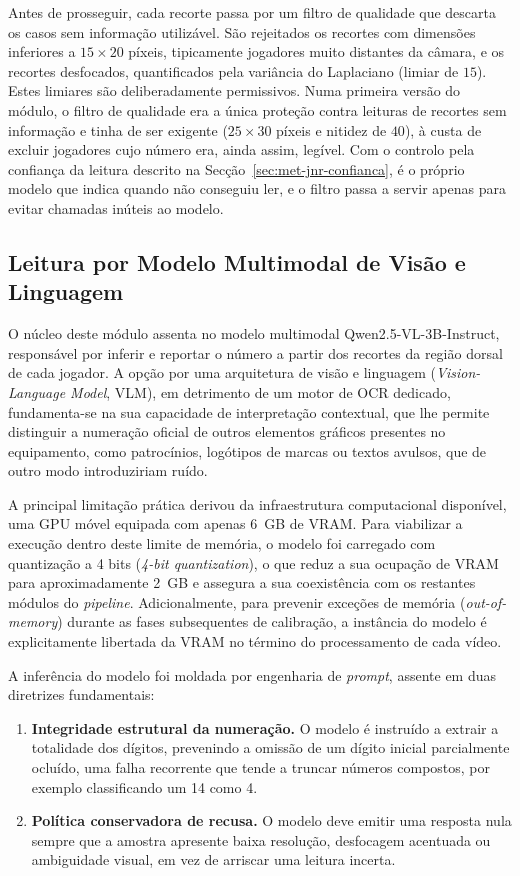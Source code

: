 Antes de prosseguir, cada recorte passa por um filtro de qualidade que descarta os casos sem informação utilizável. São rejeitados os recortes com dimensões inferiores a $15\times20$ píxeis, tipicamente jogadores muito distantes da câmara, e os recortes desfocados, quantificados pela variância do Laplaciano (limiar de $15$). Estes limiares são deliberadamente permissivos. Numa primeira versão do módulo, o filtro de qualidade era a única proteção contra leituras de recortes sem informação e tinha de ser exigente ($25\times30$ píxeis e nitidez de $40$), à custa de excluir jogadores cujo número era, ainda assim, legível. Com o controlo pela confiança da leitura descrito na Secção~\ref{sec:met-jnr-confianca}, é o próprio modelo que indica quando não conseguiu ler, e o filtro passa a servir apenas para evitar chamadas inúteis ao modelo.

\subsection{Leitura por Modelo Multimodal de Visão e Linguagem}

O núcleo deste módulo assenta no modelo multimodal Qwen2.5-VL-3B-Instruct, responsável por inferir e reportar o número a partir dos recortes da região dorsal de cada jogador. A opção por uma arquitetura de visão e linguagem (\emph{Vision-Language Model}, VLM), em detrimento de um motor de OCR dedicado, fundamenta-se na sua capacidade de interpretação contextual, que lhe permite distinguir a numeração oficial de outros elementos gráficos presentes no equipamento, como patrocínios, logótipos de marcas ou textos avulsos, que de outro modo introduziriam ruído.

A principal limitação prática derivou da infraestrutura computacional disponível, uma GPU móvel equipada com apenas 6~GB de VRAM. Para viabilizar a execução dentro deste limite de memória, o modelo foi carregado com quantização a 4 bits (\emph{4-bit quantization}), o que reduz a sua ocupação de VRAM para aproximadamente 2~GB e assegura a sua coexistência com os restantes módulos do \emph{pipeline}. Adicionalmente, para prevenir exceções de memória (\emph{out-of-memory}) durante as fases subsequentes de calibração, a instância do modelo é explicitamente libertada da VRAM no término do processamento de cada vídeo.

A inferência do modelo foi moldada por engenharia de \emph{prompt}, assente em duas diretrizes fundamentais:

\begin{enumerate}
    \item \textbf{Integridade estrutural da numeração.} O modelo é instruído a extrair a totalidade dos dígitos, prevenindo a omissão de um dígito inicial parcialmente ocluído, uma falha recorrente que tende a truncar números compostos, por exemplo classificando um 14 como 4.
    \item \textbf{Política conservadora de recusa.} O modelo deve emitir uma resposta nula sempre que a amostra apresente baixa resolução, desfocagem acentuada ou ambiguidade visual, em vez de arriscar uma leitura incerta.
\end{enumerate}

